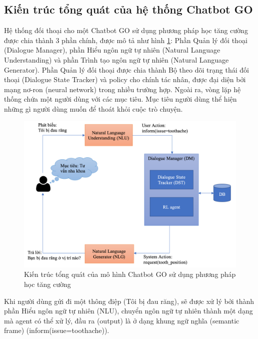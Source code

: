 \subsection{Kiến trúc tổng quát của hệ thống Chatbot GO}
Hệ thống đối thoại cho một Chatbot GO sử dụng phương pháp học tăng cường được chia thành 3 phần chính, được mô tả như hình \ref{fig:chatbot}: Phần Quản lý đối thoại (Dialogue Manager), phần Hiểu ngôn ngữ tự nhiên (Natural Language Understanding) và phần Trình tạo ngôn ngữ tự nhiên (Natural Language Generator). Phần Quản lý đối thoại được chia thành Bộ theo dõi trạng thái đối thoại (Dialogue State Tracker) và policy cho chính tác nhân, được đại diện bởi mạng nơ-ron (neural network) trong nhiều trường hợp. Ngoài ra, vòng lặp hệ thống chứa một người dùng với các mục tiêu. Mục tiêu người dùng thể hiện những gì người dùng muốn để thoát khỏi cuộc trò chuyện.

\begin{center}
    \begin{figure}[h!]
        \begin{center}
         \includegraphics[scale=0.47]{chapter3/img/chatbot.png}
        \end{center}
        \caption{Kiến trúc tổng quát của mô hình Chatbot GO sử dụng phương pháp học tăng cường}
        \label{fig:chatbot}
    \end{figure}
\end{center}

Khi người dùng gửi đi một thông điệp (Tôi bị đau răng), sẽ được xử lý bởi thành phần Hiểu ngôn ngữ tự nhiên (NLU), chuyển ngôn ngữ tự nhiên thành một dạng mà agent có thể xử lý, đầu ra (output) là ở dạng khung ngữ nghĩa (semantic frame) (inform(issue=toothache)).

